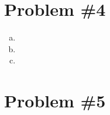 \documentclass[11pt]{article}
\numberwithin{equation}{section}
\begin{document}
\section{Problem \#4}
\begin{enumerate}[(a)]
\item
\item
\item
\end{enumerate}

\section{Problem \#5}
\end{document}

